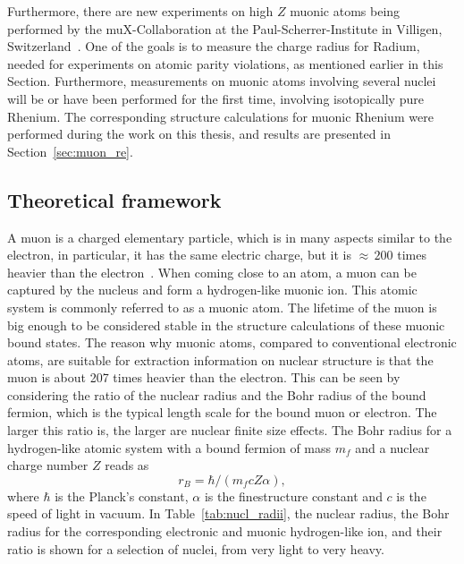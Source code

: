 Furthermore, there are new experiments on high $Z$ muonic atoms being performed by the muX-Collaboration at the Paul-Scherrer-Institute in Villigen, Switzerland~\cite{kirch2016}. One of the goals is to measure the charge radius for Radium, needed for experiments on atomic parity violations, as mentioned earlier in this Section. Furthermore, measurements on muonic atoms involving several nuclei will be or have been performed for the first time, involving isotopically pure Rhenium. The corresponding structure calculations for muonic Rhenium were performed during the work on this thesis, and results are presented in Section~\ref{sec:muon_re}.

\subsection{Theoretical framework}
\label{sec:muon_framework}
A muon is a charged elementary particle, which is in many aspects similar to the electron, in particular, it has the same electric charge, but it is ${\approx}\,{200}$ times heavier than the electron~\cite{codata}. When coming close to an atom, a muon can be captured by the nucleus and form a hydrogen-like muonic ion. This atomic system is commonly referred to as a muonic atom. The lifetime of the muon is big enough to be considered stable in the structure calculations of these muonic bound states.
The reason why muonic atoms, compared to conventional electronic atoms, are suitable for extraction information on nuclear structure is that the muon is about 207 times heavier than the electron. This can be seen by considering the ratio of the nuclear radius and the Bohr radius of the bound fermion, which is the typical length scale for the bound muon or electron. The larger this ratio is, the larger are nuclear finite size effects. The Bohr radius for a hydrogen-like atomic system with a bound fermion of mass $m_f$ and a nuclear charge number $Z$ reads as
\begin{equation}
r_B = \hbar / (m_f c Z \alpha),
\end{equation}
where $\hbar$ is the Planck's constant, $\alpha$ is the finestructure constant and $c$ is the speed of light in vacuum. In Table~\ref{tab:nucl_radii}, the nuclear radius, the Bohr radius for the corresponding electronic and muonic hydrogen-like ion, and their ratio is shown for a selection of nuclei, from very light to very heavy.
%
%
